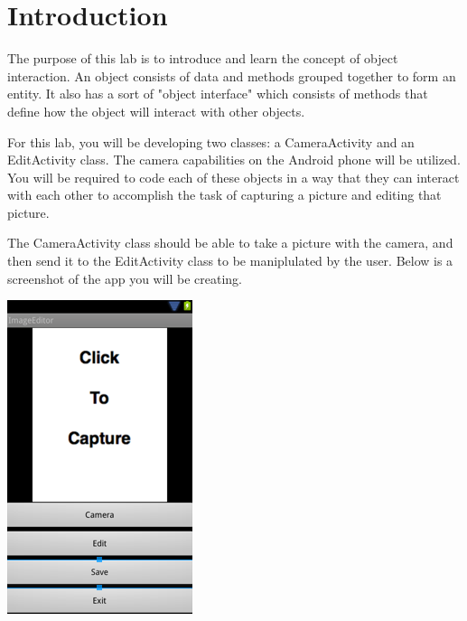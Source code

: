 \section{Introduction}

The purpose of this lab is to introduce and learn the concept of object interaction. An object consists of data and methods grouped together to form an entity. It also has a sort of "object interface" which consists of methods that define how the object will interact with other objects.

\noindent
For this lab, you will be developing two classes: a CameraActivity and an EditActivity class. The camera capabilities on the Android phone will be utilized. You will be required to code each of these objects in a way that they can interact with each other to accomplish the task of capturing a picture and editing that picture.

\noindent
The CameraActivity class should be able to take a picture with the camera, and then send it to the EditActivity class to be maniplulated by the user. Below is a screenshot of the app you will be creating.

\begin{center}
\includegraphics[scale=0.4]{screenshot.png} 
\end{center}
